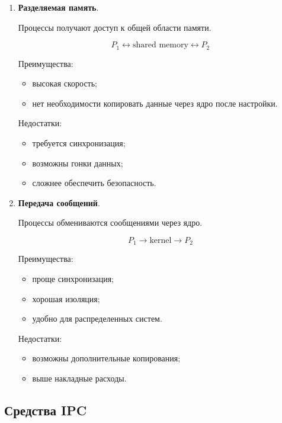 \documentclass[12pt,a4paper]{article}
\begin{document}
\begin{enumerate}
    \item \textbf{Разделяемая память}.

    Процессы получают доступ к общей области памяти.

    \[
        P_1 \leftrightarrow \text{shared memory} \leftrightarrow P_2
    \]

    Преимущества:
    \begin{itemize}
        \item высокая скорость;
        \item нет необходимости копировать данные через ядро после настройки.
    \end{itemize}

    Недостатки:
    \begin{itemize}
        \item требуется синхронизация;
        \item возможны гонки данных;
        \item сложнее обеспечить безопасность.
    \end{itemize}

    \item \textbf{Передача сообщений}.

    Процессы обмениваются сообщениями через ядро.

    \[
        P_1 \rightarrow \text{kernel} \rightarrow P_2
    \]

    Преимущества:
    \begin{itemize}
        \item проще синхронизация;
        \item хорошая изоляция;
        \item удобно для распределенных систем.
    \end{itemize}

    Недостатки:
    \begin{itemize}
        \item возможны дополнительные копирования;
        \item выше накладные расходы.
    \end{itemize}
\end{enumerate}

\subsection{Средства IPC}
\end{document}
